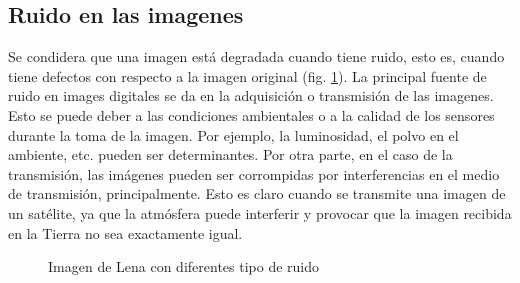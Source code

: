 \subsection{Ruido en las imagenes}\label{sec:ruido}
Se condidera que una imagen está degradada cuando tiene ruido, esto es, cuando tiene defectos con respecto a la imagen original (fig. \ref{fig:defruido}). La principal fuente de ruido en images digitales se da en la adquisición o transmisión de las imagenes. Esto se puede deber a las condiciones ambientales o a la calidad de los sensores durante la toma de la imagen. Por ejemplo, la luminosidad, el polvo en el ambiente, etc. pueden ser determinantes. Por otra parte, en el caso de la transmisión, las imágenes pueden ser corrompidas por interferencias en el medio de transmisión, principalmente. Esto es claro cuando se transmite una imagen de un satélite, ya que la atmósfera puede interferir y provocar que la imagen recibida en la Tierra no sea exactamente igual.
\begin{figure}
\centering
    \quad
    \quad
    \caption{Imagen de Lena con diferentes tipo de ruido}
    \label{fig:defruido}
\end{figure}

